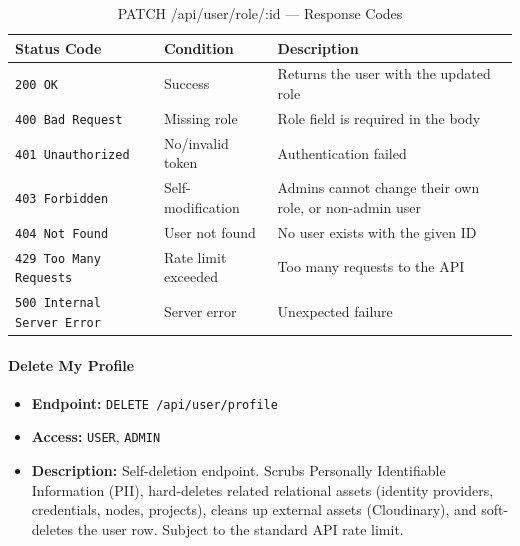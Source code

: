 \begin{table}[H]
\centering
\renewcommand{\arraystretch}{1.3}
\begin{tabularx}{\textwidth}{|l|l|X|}
\hline
\textbf{Status Code} & \textbf{Condition} & \textbf{Description} \\
\hline
\texttt{200 OK}           & Success              & Returns the user with the updated role \\
\hline
\texttt{400 Bad Request}  & Missing role         & Role field is required in the body \\
\hline
\texttt{401 Unauthorized} & No/invalid token     & Authentication failed \\
\hline
\texttt{403 Forbidden}    & Self-modification    & Admins cannot change their own role, or non-admin user \\
\hline
\texttt{404 Not Found}    & User not found       & No user exists with the given ID \\
\hline
\texttt{429 Too Many Requests} & Rate limit exceeded & Too many requests to the API \\
\hline
\texttt{500 Internal Server Error} & Server error & Unexpected failure \\
\hline
\end{tabularx}
\caption{PATCH /api/user/role/:id — Response Codes}
\label{tab:update-user-role-responses}
\end{table}
\FloatBarrier

\paragraph{Delete My Profile}
\label{subsubsec:delete-my-profile}

\begin{itemize}
  \item \textbf{Endpoint:} \texttt{DELETE /api/user/profile}
  \item \textbf{Access:} \texttt{USER}, \texttt{ADMIN}
  \item \textbf{Description:} Self-deletion endpoint. Scrubs Personally Identifiable Information (PII), hard-deletes related relational assets (identity providers, credentials, nodes, projects), cleans up external assets (Cloudinary), and soft-deletes the user row. Subject to the standard API rate limit.
\end{itemize}

